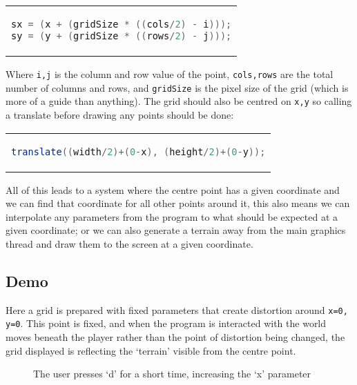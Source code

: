 \begin{center}
\begin{tabular}{c}
\begin{lstlisting}[language=java]
sx = (x + (gridSize * ((cols/2) - i)));
sy = (y + (gridSize * ((rows/2) - j)));
\end{lstlisting}
\end{tabular}
\end{center}

Where \verb|i,j| is the column and row value of the point, \verb|cols,rows|
are the total number of columns and rows, and \verb|gridSize| is the pixel size
of the grid (which is more of a guide than anything). The grid should also
be centred on \verb|x,y| so calling a translate before drawing any points should
be done:

\begin{center}
\begin{tabular}{c}
\begin{lstlisting}[language=java]
translate((width/2)+(0-x), (height/2)+(0-y));
\end{lstlisting}
\end{tabular}
\end{center}

All of this leads to a system where the centre point has a given coordinate and
we can find that coordinate for all other points around it, this also means we
can interpolate any parameters from the program to what should be expected at a
given coordinate; or we can also generate a terrain away from the main graphics
thread and draw them to the screen at a given coordinate.

\subsection{Demo}
Here a grid is prepared with fixed parameters that create distortion around
\verb|x=0, y=0|. This point is fixed, and when the program is interacted with
the world moves beneath the player rather than the point of distortion being
changed, the grid displayed is reflecting the `terrain' visible from the centre
point.

\begin{figure}[H]
\centering
{}%
\hspace*{2cm}%
\caption{The user presses `d' for a short time, increasing the `x' parameter}
\label{demomovement}
\end{figure}


